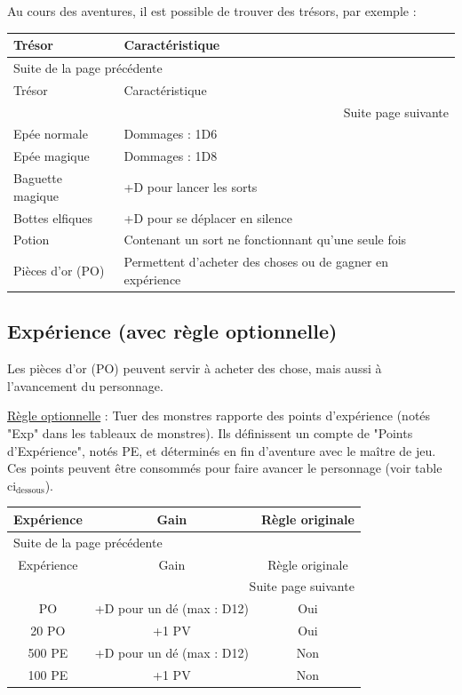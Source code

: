 \documentclass[a4paper, 11pt, twoside]{article}
\begin{document}
Au cours des aventures, il est possible de trouver des trésors, par exemple :

\begin{longtable}{l|l}
Trésor & Caractéristique\\
\hline
\endfirsthead
\multicolumn{2}{l}{Suite de la page précédente} \\
\hline

Trésor & Caractéristique \\

\hline
\endhead
\hline\multicolumn{2}{r}{Suite page suivante} \\
\endfoot
\endlastfoot
\hline
Epée normale & Dommages : 1D6\\
Epée magique & Dommages : 1D8\\
Baguette magique & +D pour lancer les sorts\\
Bottes elfiques & +D pour se déplacer en silence\\
Potion & Contenant un sort ne fonctionnant qu'une seule fois\\
Pièces d'or (PO) & Permettent d'acheter des choses ou de gagner en expérience\\
\end{longtable}

\subsection{Expérience (avec règle optionnelle)}
\label{sec:orgd443b6d}

Les pièces d'or (PO) peuvent servir à acheter des chose, mais aussi à l'avancement du personnage.

\uline{Règle optionnelle} : Tuer des monstres rapporte des points d'expérience (notés "Exp" dans les tableaux de monstres). Ils définissent un compte de "Points d'Expérience", notés PE, et déterminés en fin d'aventure avec le maître de jeu. Ces points peuvent être consommés pour faire avancer le personnage (voir table ci\(_{\text{dessous}}\)).

\begin{longtable}{c|c|c}
Expérience & Gain & Règle originale\\
\hline
\endfirsthead
\multicolumn{3}{l}{Suite de la page précédente} \\
\hline

Expérience & Gain & Règle originale \\

\hline
\endhead
\hline\multicolumn{3}{r}{Suite page suivante} \\
\endfoot
\endlastfoot
\hline
100 PO & +D pour un dé (max : D12) & Oui\\
20 PO & +1 PV & Oui\\
500 PE & +D pour un dé (max : D12) & Non\\
100 PE & +1 PV & Non\\
\end{longtable}
\end{document}
